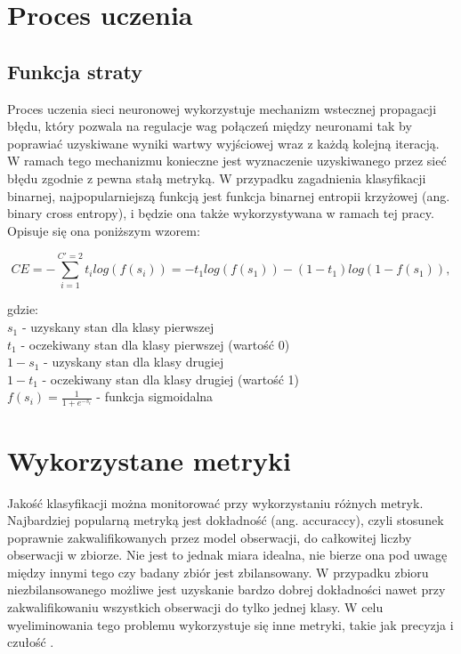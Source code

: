 \newpage %
\section{Proces uczenia}



\subsection{Funkcja straty}

Proces uczenia sieci neuronowej wykorzystuje mechanizm wstecznej propagacji błędu, który pozwala na regulacje wag połączeń między neuronami tak by poprawiać uzyskiwane wyniki wartwy wyjściowej wraz z każdą kolejną iteracją. W ramach tego mechanizmu konieczne jest wyznaczenie uzyskiwanego przez sieć błędu zgodnie z pewna stałą metryką. W przypadku zagadnienia klasyfikacji binarnej, najpopularniejszą funkcją jest funkcja binarnej entropii krzyżowej (ang. binary cross entropy), i będzie ona także wykorzystywana w ramach tej pracy. Opisuje się ona poniższym wzorem: 

$$
CE = -\sum_{i=1}^{C'=2}t_{i} log (f(s_{i})) = -t_{1} log(f(s_{1})) - (1 - t_{1}) log(1 - f(s_{1})),
$$


\noindent gdzie: \\
$s_1$ - uzyskany stan dla klasy pierwszej \\
$t_1$ - oczekiwany stan dla klasy pierwszej (wartość 0)\\
$1-s_1$ - uzyskany stan dla klasy drugiej \\
$1-t_1$ - oczekiwany stan dla klasy drugiej (wartość 1) \\
$f(s_i)=\frac{1}{1+e^{-s_i}}$ - funkcja sigmoidalna



\section{Wykorzystane metryki}

Jakość klasyfikacji można monitorować przy wykorzystaniu różnych metryk. Najbardziej popularną metryką jest dokładność (ang. accuraccy), czyli stosunek poprawnie zakwalifikowanych przez model obserwacji, do całkowitej liczby obserwacji w zbiorze. Nie jest to jednak miara idealna, nie bierze ona pod uwagę między innymi tego czy badany zbiór jest zbilansowany. W przypadku zbioru niezbilansowanego możliwe jest uzyskanie bardzo dobrej dokładności nawet przy zakwalifikowaniu wszystkich obserwacji do tylko jednej klasy. W celu wyeliminowania tego problemu wykorzystuje się inne metryki, takie jak precyzja i czułość \cite{metryki_3}.




